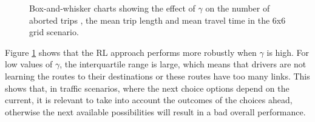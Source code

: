 \documentclass{RITA}
\begin{document}
\begin{figure}[ht]
  \centering
  \caption{Box-and-whisker charts showing the effect of $\gamma$ on the number of aborted trips , the mean trip length  and mean travel time  in the 6x6 grid scenario.}
  \label{fig:qLearningGamma-grid}
\end{figure}

Figure \ref{fig:qLearningGamma-grid} shows that the RL approach performs more robustly when $\gamma$ is high. For low values of $\gamma$, the interquartile range is large, which means that drivers are not learning the routes to their destinations or these routes have too many links. This shows that, in traffic scenarios, where the next choice options depend on the current, it is relevant to take into account the outcomes of the choices ahead, otherwise the next available possibilities will result in a bad overall performance.
\end{document}
